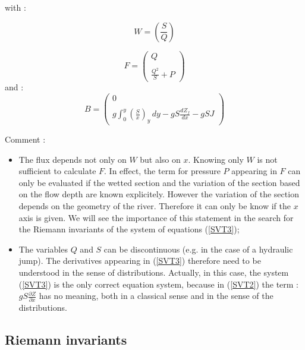with :

\begin{equation}
 W = \left ( \frac{S}{Q} \right )
\end{equation}

\begin{equation}
 F = \left (
    \begin{array}{c}
    Q \\
    \\
    \frac{Q^2}{S} + P
\end{array}
\right )
\end{equation}
and :
\begin{equation}
 B = \left (
    \begin{array}{c}
    0 \\
    \\
    g \int_{0}^y \left ( \frac{S}{x} \right )_y \, dy - g S \frac{dZ_f}{dx} - g S J
\end{array}
\right )
\end{equation}

\begin{CommentBlock}{Comment :}
\begin{itemize}
 \item The flux depends not only on $W$ but also on $x$. Knowing only $W$ is not sufficient to calculate $F$. In effect, the term for pressure $P$ appearing in $F$ can only be evaluated if the wetted section and the variation of the section based on the flow depth are known explicitely. However the variation of the section depends on the geometry of the river. Therefore it can only be know if the $x$ axis is given. We will see the importance of this statement in the search for the Riemann invariants of the system of equations (\ref{SVT3});
 \item The variables $Q$ and $S$ can be discontinuous (e.g. in the case of a hydraulic jump). The derivatives appearing in (\ref{SVT3}) therefore need to be understood in the sense of distributions. Actually, in this case, the system (\ref{SVT3}) is the only correct equation system, because in (\ref{SVT2}) the term : $g S \frac{\partial Z}{\partial x}$ has no meaning, both in a classical sense and in the sense of the distributions.
\end{itemize}
\end{CommentBlock}

\subsection{Riemann invariants}

